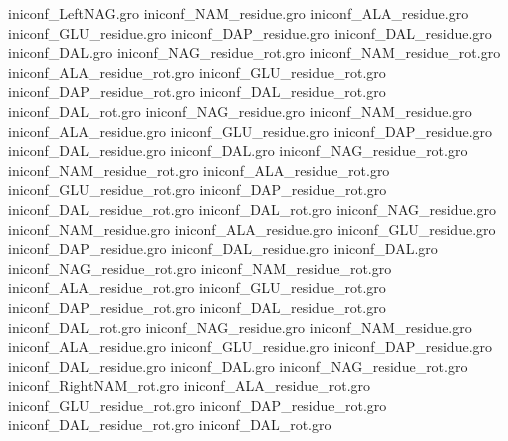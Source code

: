 iniconf_LeftNAG.gro
iniconf_NAM_residue.gro
iniconf_ALA_residue.gro
iniconf_GLU_residue.gro
iniconf_DAP_residue.gro
iniconf_DAL_residue.gro
iniconf_DAL.gro
iniconf_NAG_residue_rot.gro
iniconf_NAM_residue_rot.gro
iniconf_ALA_residue_rot.gro
iniconf_GLU_residue_rot.gro
iniconf_DAP_residue_rot.gro
iniconf_DAL_residue_rot.gro
iniconf_DAL_rot.gro
iniconf_NAG_residue.gro
iniconf_NAM_residue.gro
iniconf_ALA_residue.gro
iniconf_GLU_residue.gro
iniconf_DAP_residue.gro
iniconf_DAL_residue.gro
iniconf_DAL.gro
iniconf_NAG_residue_rot.gro
iniconf_NAM_residue_rot.gro
iniconf_ALA_residue_rot.gro
iniconf_GLU_residue_rot.gro
iniconf_DAP_residue_rot.gro
iniconf_DAL_residue_rot.gro
iniconf_DAL_rot.gro
iniconf_NAG_residue.gro
iniconf_NAM_residue.gro
iniconf_ALA_residue.gro
iniconf_GLU_residue.gro
iniconf_DAP_residue.gro
iniconf_DAL_residue.gro
iniconf_DAL.gro
iniconf_NAG_residue_rot.gro
iniconf_NAM_residue_rot.gro
iniconf_ALA_residue_rot.gro
iniconf_GLU_residue_rot.gro
iniconf_DAP_residue_rot.gro
iniconf_DAL_residue_rot.gro
iniconf_DAL_rot.gro
iniconf_NAG_residue.gro
iniconf_NAM_residue.gro
iniconf_ALA_residue.gro
iniconf_GLU_residue.gro
iniconf_DAP_residue.gro
iniconf_DAL_residue.gro
iniconf_DAL.gro
iniconf_NAG_residue_rot.gro
iniconf_RightNAM_rot.gro
iniconf_ALA_residue_rot.gro
iniconf_GLU_residue_rot.gro
iniconf_DAP_residue_rot.gro
iniconf_DAL_residue_rot.gro
iniconf_DAL_rot.gro
